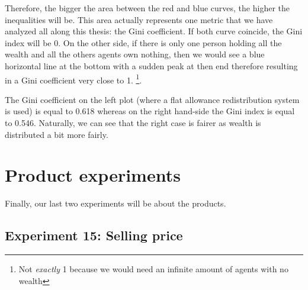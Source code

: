 {{{{{{{{{{{{{    Therefore, the bigger the area between the red and blue curves, the higher the inequalities will be. This area actually represents one metric that we have analyzed all along this thesis: the Gini coefficient. If both curve coincide, the Gini index will be 0. On the other side, if there is only one person holding all the wealth and all the others agents own nothing, then we would see a blue horizontal line at the bottom with a sudden peak at then end therefore resulting in a Gini coefficient very close to 1. \footnote{Not \emph{exactly} 1 because we would need an infinite amount of agents with no wealth}.

    The Gini coefficient on the left plot (where a flat allowance redistribution system is used) is equal to 0.618 whereas on the right hand-side the Gini index is equal to 0.546. Naturally, we can see that the right case is fairer as wealth is distributed a bit more fairly.


\section{Product experiments}
    Finally, our last two experiments will be about the products. 


    \subsection{Experiment 15: Selling price}
    

}}}}}}}}}}}}}
